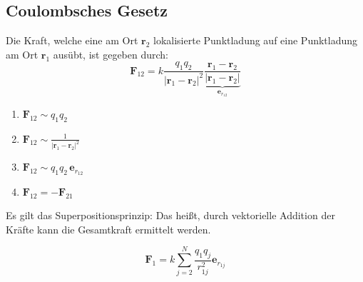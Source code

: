\documentclass[titlepage,11pt,a4paper,ngerman]{report}
\newcommand{\summ}[2]{\sum_{#1}^{#2}}
\renewcommand{\vec}[1]{\boldsymbol{#1}}
\begin{document}
\subsection{Coulombsches Gesetz}

\begin{minipage}{.585\linewidth}
	Die Kraft, welche eine am Ort $\vec{r}_2$ lokalisierte Punktladung auf eine Punktladung am Ort $\vec{r}_1$ ausübt, ist gegeben durch:
	$$\vec{F}_{12} = k \frac{q_1 q_2}{|\vec{r}_1 - \vec{r}_2|^2} \underbrace{\frac{\vec{r}_1 - \vec{r}_2}{|\vec{r}_1 - \vec{r}_2|}}_{\vec{e}_{r_{12}}}$$
\end{minipage}
\begin{minipage}{.4\linewidth}
	
	
	\hspace{30pt}
\end{minipage}

\begin{enumerate}
	\item $\vec{F}_{12} \sim q_1 q_2$
	\item $\vec{F}_{12} \sim \frac{1}{|\vec{r}_1 - \vec{r}_2|^2}$
	\item $\vec{F}_{12} \sim q_1 q_2\, \vec{e}_{r_{12}}$
	\item $\vec{F}_{12} = -\vec{F}_{21}$
\end{enumerate}
Es gilt das Superpositionsprinzip: Das heißt, durch vektorielle Addition der Kräfte kann die Gesamtkraft ermittelt werden.

$$\vec{F}_1 = k \summ{j = 2}{N} \frac{q_1 q_j}{r_{1j}^2}\vec{e}_{r_{1j}}$$
\end{document}
